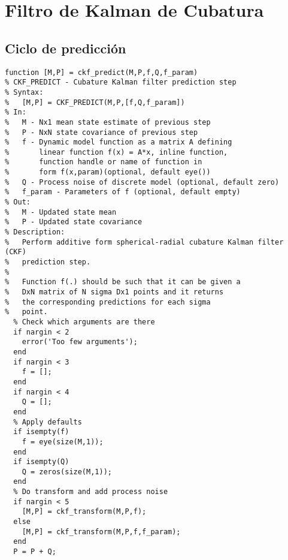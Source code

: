 \section{Filtro de Kalman de Cubatura}
\subsection{Ciclo de predicción}
\lstset{language=Matlab, breaklines=true, basicstyle=\footnotesize}
\lstset{numbers=left, numberstyle=\tiny, stepnumber=1, numbersep=-2pt}
\begin{lstlisting}[frame=single]
function [M,P] = ckf_predict(M,P,f,Q,f_param)
% CKF_PREDICT - Cubature Kalman filter prediction step
% Syntax:
%   [M,P] = CKF_PREDICT(M,P,[f,Q,f_param])
% In:
%   M - Nx1 mean state estimate of previous step
%   P - NxN state covariance of previous step
%   f - Dynamic model function as a matrix A defining
%       linear function f(x) = A*x, inline function,
%       function handle or name of function in
%       form f(x,param)(optional, default eye())
%   Q - Process noise of discrete model (optional, default zero)
%   f_param - Parameters of f (optional, default empty)
% Out:
%   M - Updated state mean
%   P - Updated state covariance
% Description:
%   Perform additive form spherical-radial cubature Kalman filter (CKF)
%   prediction step.
%
%   Function f(.) should be such that it can be given a
%   DxN matrix of N sigma Dx1 points and it returns 
%   the corresponding predictions for each sigma
%   point. 
  % Check which arguments are there
  if nargin < 2
    error('Too few arguments');
  end
  if nargin < 3
    f = [];
  end
  if nargin < 4
    Q = [];
  end
  % Apply defaults
  if isempty(f)
    f = eye(size(M,1));
  end
  if isempty(Q)
    Q = zeros(size(M,1));
  end
  % Do transform and add process noise
  if nargin < 5
    [M,P] = ckf_transform(M,P,f);      
  else
    [M,P] = ckf_transform(M,P,f,f_param);
  end
  P = P + Q;
\end{lstlisting}
